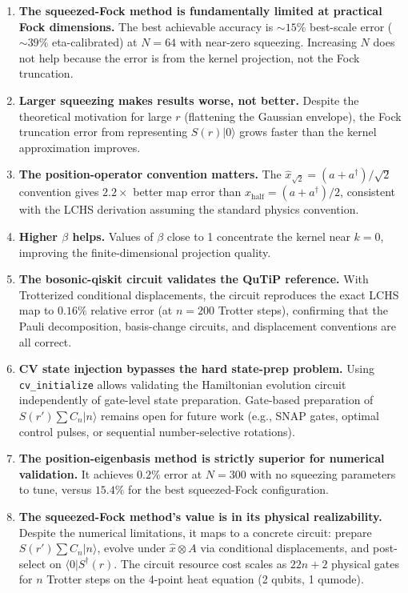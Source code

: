 \documentclass[11pt]{article}
\begin{document}
\begin{enumerate}[itemsep=3pt]
  \item \textbf{The squeezed-Fock method is fundamentally limited at practical
        Fock dimensions.}
        The best achievable accuracy is $\sim\!15\%$ best-scale error ($\sim\!39\%$
        eta-calibrated) at $N = 64$ with near-zero squeezing.  Increasing $N$ does
        not help because the error is from the kernel projection, not the Fock
        truncation.

  \item \textbf{Larger squeezing makes results worse, not better.}
        Despite the theoretical motivation for large $r$ (flattening the
        Gaussian envelope), the Fock truncation error from representing
        $S(r)|0\rangle$ grows faster than the kernel approximation improves.

  \item \textbf{The position-operator convention matters.}
        The $\hat{x}_{\sqrt{2}} = (a+a^\dagger)/\sqrt{2}$ convention gives
        $2.2\times$ better map error than $\hat{x}_{\text{half}} = (a+a^\dagger)/2$,
        consistent with the LCHS derivation assuming the standard physics convention.

  \item \textbf{Higher $\beta$ helps.}
        Values of $\beta$ close to 1 concentrate the kernel near $k = 0$,
        improving the finite-dimensional projection quality.

  \item \textbf{The bosonic-qiskit circuit validates the QuTiP reference.}
        With Trotterized conditional displacements, the circuit reproduces
        the exact LCHS map to $0.16\%$ relative error (at $n=200$ Trotter steps),
        confirming that the Pauli decomposition, basis-change circuits, and
        displacement conventions are all correct.

  \item \textbf{CV state injection bypasses the hard state-prep problem.}
        Using \texttt{cv\_initialize} allows validating the Hamiltonian evolution
        circuit independently of gate-level state preparation.
        Gate-based preparation of $S(r')\sum C_n|n\rangle$ remains open for
        future work (e.g., SNAP gates, optimal control pulses, or sequential
        number-selective rotations).

  \item \textbf{The position-eigenbasis method is strictly superior for numerical
        validation.}
        It achieves $0.2\%$ error at $N = 300$ with no squeezing parameters to tune,
        versus $15.4\%$ for the best squeezed-Fock configuration.

  \item \textbf{The squeezed-Fock method's value is in its physical realizability.}
        Despite the numerical limitations, it maps to a concrete circuit:
        prepare $S(r')\sum C_n|n\rangle$, evolve under $\hat{x}\otimes A$
        via conditional displacements, and post-select on $\langle 0|S^\dagger(r)$.
        The circuit resource cost scales as $22n + 2$ physical gates for
        $n$ Trotter steps on the 4-point heat equation (2 qubits, 1 qumode).
\end{enumerate}
\end{document}
